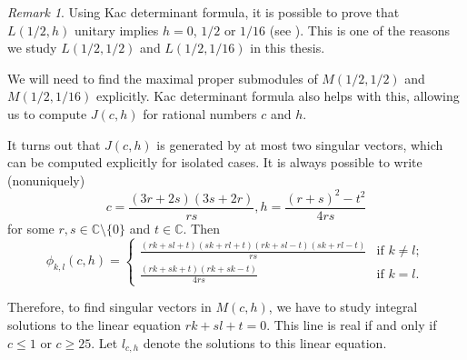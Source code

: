 \documentclass[a4paper, 12pt, reqno]{amsart}
\theoremstyle{remark}
\newtheorem{remark}[theorem]{Remark}
\begin{document}
\begin{remark}
  \label{rmk:29}
  Using Kac determinant formula, it is possible to prove that $L(1/2, h)$ unitary implies $h = 0$, $1/2$ or $1/16$ (see \cite[\S3]{kac_bombay_2013}).
  This is one of the reasons we study $L(1/2, 1/2)$ and $L(1/2, 1/16)$ in this thesis.
\end{remark}

We will need to find the maximal proper submodules of $M(1/2, 1/2)$ and $M(1/2, 1/16)$ explicitly.
Kac determinant formula also helps with this, allowing us to compute $J(c, h)$ for rational numbers $c$ and $h$.

It turns out that $J(c, h)$ is generated by at most two singular vectors, which can be computed explicitly for isolated cases.
It is always possible to write (nonuniquely)
\begin{equation*}
  c = \frac{(3r + 2s)(3s + 2r)}{rs}, h = \frac{(r + s)^2 - t^2}{4rs}
\end{equation*}
for some $r, s \in \mathbb{C} \setminus \{0\}$ and $t \in \mathbb{C}$.
Then
\begin{equation*}
  \phi_{k, l}(c, h) =
  \begin{cases}
    \frac{(rk + sl + t)(sk + rl + t)(rk + sl - t)(sk + rl - t)}{rs} &\text{if $k \neq l$};\\
    \frac{(rk + sk + t)(rk + sk - t)}{4rs} &\text{if $k = l$}.
  \end{cases}
\end{equation*}

Therefore, to find singular vectors in $M(c, h)$, we have to study integral solutions to the linear equation $rk + sl + t = 0$.
This line is real if and only if $c \le 1$ or $c \ge 25$.
Let $l_{c, h}$ denote the solutions to this linear equation.
\end{document}
